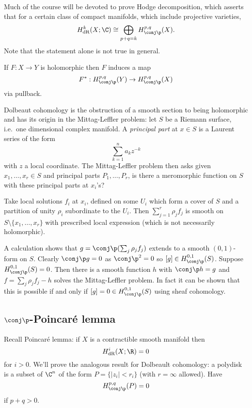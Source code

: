 \documentclass[a4paper]{article}
\begin{document}
Much of the course will be devoted to prove Hodge decomposition, which asserts that for a certain class of compact manifolds, which include projective varieties,
\[
  H_{\text{dR}}^k(X; \C) \cong \bigoplus_{p + q = k} H_{\conj \p}^{p, q}(X).
\]
Note that the statement alone is not true in general.

\begin{ex}
  If \(F: X \to Y\) is holomorphic then \(F\) induces a map
  \[
    F^*: H_{\conj \p}^{p, q}(Y) \to H_{\conj \p}^{p, q}(X)
  \]
  via pullback.
\end{ex}

Dolbeaut cohomology is the obstruction of a smooth section to being holomorphic and has its origin in the Mittag-Leffler problem: let \(S\) be a Riemann surface, i.e.\ one dimensional complex manifold. A \emph{principal part} at \(x \in S\) is a Laurent series of the form
\[
  \sum_{k = 1}^n a_k z^{-k}
\]
with \(z\) a local coordinate. The Mittag-Leffler problem then asks given \(x_1, \dots, x_r \in S\) and principal parts \(P_1, \dots, P_r\), is there a meromorphic function on \(S\) with these principal parts at \(x_i\)'s?

Take local solutions \(f_i\) at \(x_i\), defined on some \(U_i\) which form a cover of \(S\)  and a partition of unity \(\rho_i\) subordinate to the \(U_i\). Then \(\sum_{j = 1}^r \rho_j f_j\) is smooth on \(S \setminus \{x_1, \dots, x_r\}\) with prescribed local expression (which is not necessarily holomorphic).

A calculation shows that \(g = \conj \p (\sum_j \rho_j f_j)\) extends to a smooth \((0, 1)\)-form on \(S\). Clearly \(\conj \p g = 0\) as \(\conj \p^2 = 0\) so \([g] \in H_{\conj \p}^{0, 1}(S)\). Suppose \(H_{\conj \p}^{0, 1}(S) = 0\). Then there is a smooth function \(h\) with \(\conj \p h = g\) and \(f = \sum_j \rho_j f_j - h\) solves the Mittag-Leffler problem. In fact it can be shown that this is possible if and only if \([g] = 0 \in H^{0, 1}_{\conj \p}(S)\) using sheaf cohomology.

\subsection{\(\conj \p\)-Poincaré lemma}

Recall Poincaré lemma: if \(X\) is a contractible smooth manifold then
\[
  H_{\text{dR}}^i (X; \R) = 0
\]
for \(i > 0\). We'll prove the analogous result for Dolbeault cohomology: a polydisk is a subset of \(\C^n\) of the form \(P = \{|z_i| < r_i\}\) (with \(r = \infty\) allowed). Have
\[
  H_{\conj \p}^{p, q}(P) = 0
\]
if \(p + q > 0\).
\end{document}
